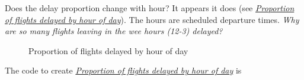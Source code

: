 \documentclass[letterpaper,10pt,english]{sphinxmanual}
\begin{document}
Does the delay proportion change with hour? It appears it does (see {\hyperref[airline:delay-by-hour]{\emph{Proportion of flights delayed by hour of day}}}). The hours are scheduled
departure times. \emph{Why are so many flights leaving in the wee hours (12-3) delayed?}
\begin{figure}[htbp]
\centering
\capstart

\caption{Proportion of flights delayed by hour of day}\label{airline:delay-by-hour}\end{figure}

The code to create {\hyperref[airline:delay-by-hour]{\emph{Proportion of flights delayed by hour of day}}} is
\end{document}
